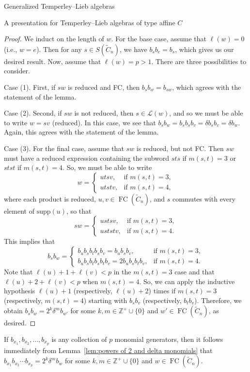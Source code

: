 \documentclass[11pt]{amsart}
\theoremstyle{definition}
\numberwithin{equation}{section}
\newcommand{\Z}{\mathbb{Z}}
\newcommand{\C}{\widetilde{C}}
\newcommand{\supp}{\mathrm{supp}}
\renewcommand{\L}{\mathcal{L}}
\renewcommand{\(}{\left(}
\renewcommand{\)}{\right)}
\DeclareMathOperator{\FC}{FC}
\begin{document}
\begin{section}{Generalized Temperley--Lieb algebras}
\begin{subsection}{A presentation for Temperley--Lieb algebras of type affine $C$}
\begin{proof}
We induct on the length of $w$.  For the base case, assume that $\ell(w)=0$ (i.e., $w=e$).  Then for any $s \in S(\C_{n})$, we have $b_{s}b_{e}=b_{s}$, which gives us our desired result.  Now, assume that $\ell(w)=p>1$.  There are three possibilities to consider.  

Case (1).  First, if $sw$ is reduced and FC, then $b_{s}b_{w}=b_{sw}$, which agrees with the statement of the lemma.

Case (2).  Second, if $sw$ is not reduced, then $s \in \L(w)$, and so we must be able to write $w=sv$ (reduced).  In this case, we see that $b_{s}b_{w}=b_{s}b_{s}b_{v}=\delta b_{s}b_{v}=\delta b_{w}$.  Again, this agrees with the statement of the lemma.

Case (3).  For the final case, assume that $sw$ is reduced, but not FC.  Then $sw$ must have a reduced expression containing the subword $sts$ if $m(s,t)=3$ or $stst$ if $m(s,t)=4$.  So, we must be able to write
\[
w=\begin{cases}
utsv, & \text{if } m(s,t)=3,\\
utstv, & \text{if } m(s,t)=4,
\end{cases}
\]
where each product is reduced, $u, v \in \FC(\C_{n})$, and $s$ commutes with every element of $\supp(u)$, so that
\[
sw=\begin{cases}
ustsv, & \text{if } m(s,t)=3,\\
uststv, & \text{if } m(s,t)=4.
\end{cases}
\]
This implies that
\[
b_{s}b_{w}=\begin{cases}
b_{u}b_{s}b_{t}b_{s}b_{v}=b_{u}b_{s}b_{v}, & \text{if } m(s,t)=3,\\
b_{u}b_{s}b_{t}b_{s}b_{t}b_{v}=2b_{u}b_{s}b_{t}b_{v}, & \text{if } m(s,t)=4.
\end{cases}
\]
Note that $\ell(u)+1+\ell(v) < p$ in the $m(s,t)=3$ case and that $\ell(u)+2+\ell(v) < p$ when $m(s,t)=4$.  So, we can apply the inductive hypothesis $\ell(u)+1$ (respectively, $\ell(u)+2$) times if $m(s,t)=3$ (respectively, $m(s,t)=4$) starting with $b_{s}b_{v}$ (respectively, $b_{t}b_{v}$).  Therefore, we obtain $b_{s}b_{w}=2^{k}\delta^{m}b_{w'}$ for some $k, m \in \Z^{+}\cup \{0\}$ and $w' \in \FC(\C_{n})$, as desired.
\end{proof}

If $b_{x_{1}}, b_{x_{2}}, \dots, b_{x_{p}}$ is any collection of $p$ monomial generators, then it follows immediately from Lemma~\ref{lem:powers of 2 and delta monomials}  that $b_{x_{1}}b_{x_{2}}\cdots b_{x_{p}}=2^{k}\delta^{m} b_{w}$ for some $k, m \in \Z^{+}\cup \{0\}$ and $w \in \FC(\C_{n})$.


\end{subsection}
\end{section}
\end{document}
